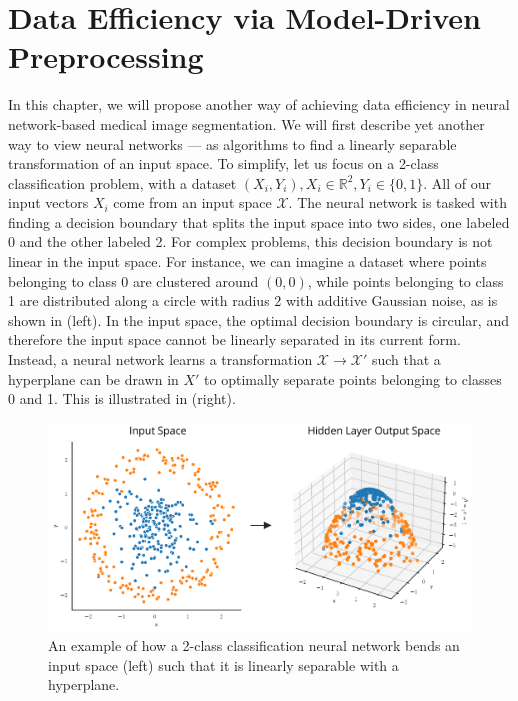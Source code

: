
\chapter{Data Efficiency via Model-Driven Preprocessing}
\label{chap:model-driven-preprocessing}


In this chapter, we will propose another way of achieving data efficiency in neural network-based medical image segmentation. We will first describe yet another way to view neural networks --- as algorithms to find a linearly separable transformation of an input space. To simplify, let us focus on a 2-class classification problem, with a dataset ${(X_i, Y_i)}, X_i \in \mathbb{R}^2, Y_i \in \{0, 1\}$. All of our input vectors $X_i$ come from an input space $\mathcal{X}$. The neural network is tasked with finding a decision boundary that splits the input space into two sides, one labeled 0 and the other labeled 2. For complex problems, this decision boundary is not linear in the input space. For instance, we can imagine a dataset where points belonging to class 0 are clustered around $(0, 0)$, while points belonging to class 1 are distributed along a circle with radius 2 with additive Gaussian noise, as is shown in (left). In the input space, the optimal decision boundary is circular, and therefore the input space cannot be linearly separated in its current form. Instead, a neural network learns a transformation $\mathcal{X} \rightarrow \mathcal{X'}$ such that a hyperplane can be drawn in $X'$ to optimally separate points belonging to classes 0 and 1. This is illustrated in (right). 

	\begin{figure}[h]
		\centering
		\includegraphics[width=0.65\linewidth]{images/4/nn_trans_dataset}
		\caption{An example of how a 2-class classification neural network bends an input space (left) such that it is linearly separable with a hyperplane.}
		\label{fig:input-space-transform}
	\end{figure}

